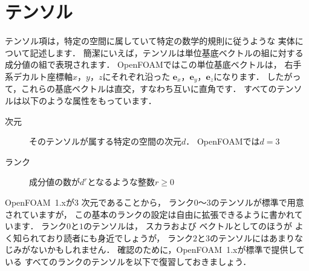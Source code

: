 \section{テンソル}
\label{sec:1.2}
テンソル項は，特定の空間に属していて特定の数学的規則に従うような
実体について記述します．
簡潔にいえば，テンソルは単位基底ベクトルの組に対する
成分値の組で表現されます．
OpenFOAMではこの単位基底ベクトルは，
%
右手系デカルト座標軸$x$，$y$，$z$にそれぞれ沿った
$\mathbf{e}_{x}$，$\mathbf{e}_{y}$，$\mathbf{e}_{z}$になります．
したがって，これらの基底ベクトルは直交，すなわち互いに直角です．
すべてのテンソルは以下のような属性をもっています．
\begin{description}
 \item[次元] そのテンソルが属する特定の空間の次元$d$．
            OpenFOAMでは$d = 3$
 \item[ランク]
%
            成分値の数が$d^{r}$となるような整数$r \ge 0$
\end{description}
OpenFOAM~1.xが3
%
次元であることから，
ランク$0$〜$3$のテンソルが標準で用意されていますが，
この基本のランクの設定は自由に拡張できるように書かれています．
ランク$0$と$1$のテンソルは，
%
スカラおよび
%
ベクトルとしてのほうが
よく知られており読者にも身近でしょうが，
ランク$2$と$3$のテンソルにはあまりなじみがないかもしれません．
確認のために，OpenFOAM~1.xが標準で提供している
すべてのランクのテンソルを以下で復習しておきましょう．
